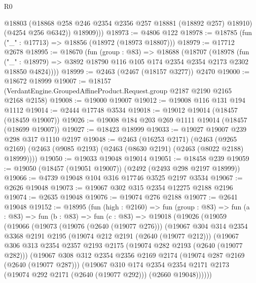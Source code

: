 \begin{lexlean}{R0}
\begin{coremodule}
            @18803
            (@18868 @258 @246 @2354 @2356 @257 @18881 (@18892 @257) @18910)
            (@4254 @256 @6342))
          @18909)))
@18973 := @4806 @122
@18978 := @18785 (fun ("_" : @17713) => @18856 (@18972 (@18973 @18807)))
@18979 := @17712 @2678
@18995 := @18670
    (fun (group : @83) =>
    @18688
      (@18707
        (@18978
          (fun ("_" : @18979) =>
          @3892 @18790 @116 @105 @174 @2354 @2354 @2173 @2302 @18850 @4824))))
@18999 := @2463 (@2467 (@18157 @3277)) @2470
@19000 := @18672 @18999
@19007 := @18157 (VerdantEngine.GroupedAffineProduct.Request.group @2187 @2190 @2165 @2168 @2158)
@19008 := @19000 @19007
@19012 := @19008 @116 @131 @194 @1112
@19014 := @2444 @17748 @3534
@19018 := @19012 @19014 (@18457 (@18459 @19007))
@19026 := @19008 @184 @203 @269 @1111 @19014 (@18457 (@18699 @19007))
@19027 := @18423 @18999
@19033 := @19027 @19007 @239 @298 @317 @1110 @2197
@19048 := @2463
    (@16253 @2171)
    (@2463 (@9265 @2169) (@2463 (@9085 @2193) (@2463 (@8630 @2191) (@2463 (@8022 @2188) @18999))))
@19050 := @19033 @19048 @19014
@19051 := @18458 @239
@19059 := @19050 (@18457 (@19051 @19007)) (@2492 (@2493 @298 @2197 @18999))
@19066 := @4739 @19048 @104 @316 @17746 @3525 @2197 @3534
@19067 := @2626 @19048
@19073 := @19067 @302 @315 @2354 @12275 @2188 @2196
@19074 := @2635 @19048
@19076 := @19074 @276 @2188
@19077 := @2641 @19048
@19152 := @18995
    (fun (high : @2160) =>
    fun (group : @83) =>
    fun (a : @83) =>
    fun (b : @83) =>
    fun (c : @83) =>
    @19018
      (@19026
        (@19059
          (@19066
            (@19073
              (@19076 (@2640 (@19077 @276)))
              (@19067
                @304
                @314
                @2354
                @3368
                @2191
                @2195
                (@19074 @212 @2191 (@2640 (@19077 @212)))
                (@19067
                  @306
                  @313
                  @2354
                  @2357
                  @2193
                  @2175
                  (@19074 @282 @2193 (@2640 (@19077 @282)))
                  (@19067
                    @308
                    @312
                    @2354
                    @2356
                    @2169
                    @2174
                    (@19074 @287 @2169 (@2640 (@19077 @287)))
                    (@19067
                      @310
                      @174
                      @2354
                      @2354
                      @2171
                      @2173
                      (@19074 @292 @2171 (@2640 (@19077 @292)))
                      (@2660 @19048))))))

\end{coremodule}
\end{lexlean}
